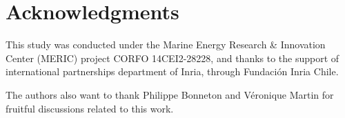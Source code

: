 \section*{Acknowledgments}

\indent This study was conducted under the Marine Energy Research \& Innovation Center (MERIC) project CORFO 14CEI2-28228, and thanks to the support of international partnerships department of Inria, through Fundación Inria Chile.

\indent The authors also want to thank Philippe Bonneton and Véronique Martin for fruitful discussions related to this work.